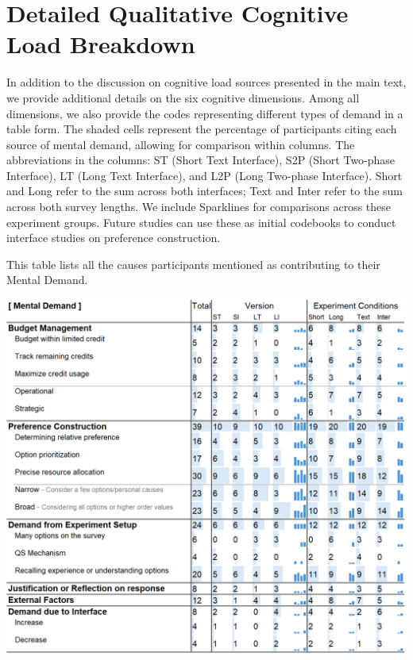 \section{Detailed Qualitative Cognitive Load Breakdown}
\label{apdx:cog_qual}

In addition to the discussion on cognitive load sources presented in the main text, we provide additional details on the six cognitive dimensions. Among all dimensions, we also provide the codes representing different types of demand in a table form. The shaded cells represent the percentage of participants citing each source of mental demand, allowing for comparison within columns. The abbreviations in the columns: ST (Short Text Interface), S2P (Short Two-phase Interface), LT (Long Text Interface), and L2P (Long Two-phase Interface). Short and Long refer to the sum across both interfaces; Text and Inter refer to the sum across both survey lengths. We include Sparklines for comparisons across these experiment groups. Future studies can use these as initial codebooks to conduct interface studies on preference construction.

\begin{table}[p]
   \caption{This table lists all the causes participants mentioned as contributing to their Mental Demand.}
    \label{tbl:mental}
    \includegraphics[width=0.95\linewidth]{content/image/cog/mental_table.png}
\end{table}

